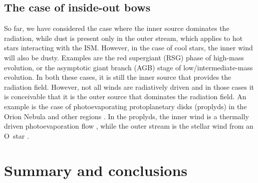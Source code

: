 \subsection{The case of inside-out bows}
\label{sec:case-inside-out}

So far, we have considered the case where the inner source dominates
the radiation, while dust is present only in the outer stream, which
applies to hot stars interacting with the ISM.  However, in the case
of cool stars, the inner wind will also be dusty.  Examples are the
red supergiant (RSG) phase of high-mass evolution, or the asymptotic
giant branch (AGB) stage of low/intermediate-mass evolution.  In both
these cases, it is still the inner source that provides the radiation
field.  However, not all winds are radiatively driven and in those
cases it is conceivable that it is the outer source that dominates the
radiation field.  An example is the case of photoevaporating
protoplanetary disks (proplyds) in the Orion Nebula and other \hii{}
regions \citep{ODell:1994a}.  In the proplyds, the inner wind is a
thermally driven photoevaporation flow \citep{HA:1998, Henney:1999a},
while the outer stream is the stellar wind from an O~star
\citep{Garcia-Arredondo:2001a}.


\section{Summary and conclusions}
\label{sec:conclusions}



